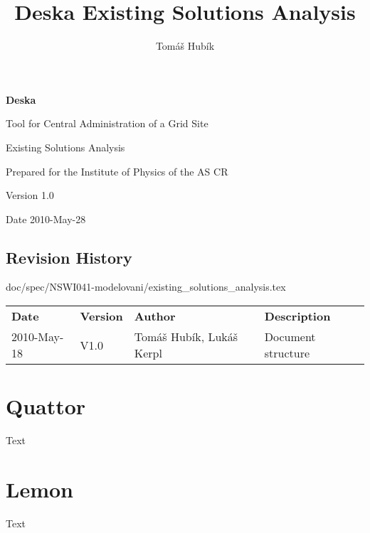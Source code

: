 \documentclass[12pt]{article}
\author{Tomáš Hubík}
\title{Deska Existing Solutions Analysis}
\begin{document}
{\Huge \textbf{Deska}}

\vspace{0.2in}

{\large Tool for Central Administration of a Grid Site}

\vspace{0.5in}

{\large Existing Solutions Analysis}

\vspace{0.2in}

{\large Prepared for the Institute of Physics of the AS CR}

\vspace{0.2in}

{\large Version 1.0}

\vspace{0.2in}

{\large Date 2010-May-28}

\vspace{0.5in}

\subsection*{Revision History}

\begin{table}[!h]doc/spec/NSWI041-modelovani/existing\_solutions\_analysis.tex
	\begin{tabular}{l l l l}
		\textbf{Date} & \textbf{Version} & \textbf{Author} & \textbf{Description} \\
		2010-May-18 & V1.0 & Tomáš Hubík, Lukáš Kerpl & Document structure \\ 
	\end{tabular}
	\label{tab:RevisionHistory}
\end{table}

\newpage

\tableofcontents

\newpage




\section{Quattor}
Text



\section{Lemon}
Text
\end{document}
